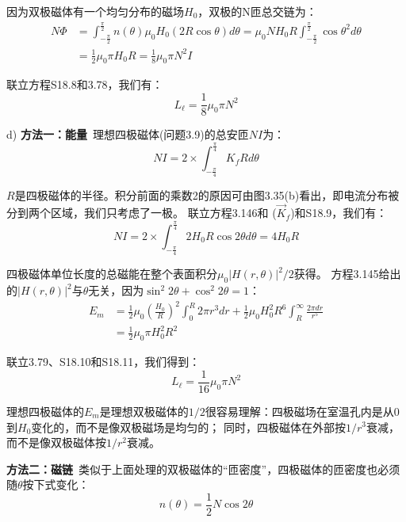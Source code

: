 因为双极磁体有一个均匀分布的磁场$H_0$，双极的N匝总交链为：
\begin{equation}%
\begin{split}
N\Phi&=\int_{-\frac{\pi}{2}}^{\frac{\pi}{2}}n(\theta)\mu_0H_0(2R\cos\theta)d\theta=
\mu_0NH_0R\int_{-\frac{\pi}{2}}^{\frac{\pi}{2}}\cos\theta^2d\theta \\
&=\frac{1}{2}\mu_0\pi H_0 R=\frac{1}{8}\mu_0\pi N^2I
\end{split}
\end{equation}

联立方程S18.8和3.78，我们有：
 \begin{equation}%
L_\ell=\frac{1}{8}\mu_0\pi N^2
\end{equation}

d) \textbf{方法一：能量}\ 理想四极磁体(问题3.9)的总安匝$NI$为：
\begin{equation}%
NI=2\times\int_{-\frac{\pi}{4}}^{\frac{\pi}{4}}K_fRd\theta
\end{equation}

$R$是四极磁体的半径。积分前面的乘数2的原因可由图3.35(b)看出，即电流分布被分到两个区域，我们只考虑了一极。
联立方程3.146和 ($\vec{K}_f$)和S18.9，我们有：
 \begin{equation}%
NI=2\times\int_{-\frac{\pi}{4}}^{\frac{\pi}{4}}2H_0R\cos 2\theta d\theta=4H_0R
\end{equation}

四极磁体单位长度的总磁能在整个表面积分$\mu_0|H(r,\theta)|^2/2$获得。
方程3.145给出的$|H(r,\theta)|^2$与$\theta$无关，因为$\sin^2 2\theta+\cos^2 2\theta=1$：
\begin{equation}%
\begin{split}
E_m&=\frac{1}{2}\mu_0(\frac{H_0}{R})^2\int_{0}^{R}2\pi r^3dr+\frac{1}{2}\mu_0H_{0}^{2}R^6\int_{R}^{\infty}\frac{2\pi dr}{r^5}\\
&=\frac{1}{2}\mu_0\pi H_{0}^{2}R^2
\end{split}
\end{equation}

联立3.79、S18.10和S18.11，我们得到：
 \begin{equation}%
L_\ell=\frac{1}{16}\mu_0\pi N^2
\end{equation}

理想四极磁体的$E_m$是理想双极磁体的$1/2$很容易理解：四极磁场在室温孔内是从$0$到$H_0$变化的，而不是像双极磁场是均匀的；
同时，四极磁体在外部按$1/r^3$衰减，而不是像双极磁体按$1/r^2$衰减。

\textbf{方法二：磁链}\ 类似于上面处理的双极磁体的“匝密度”，四极磁体的匝密度也必须随$\theta$按下式变化：
 \begin{equation}%
n(\theta)=\frac{1}{2}N\cos 2\theta
\end{equation}


